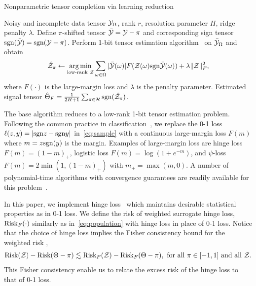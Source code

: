 \documentclass[twoside,11pt]{article}
\theoremstyle{plain}
\theoremstyle{definition}
\def\sign{\textup{sgn}}
\def\risk{\textup{Risk}}
\begin{document}
\begin{algorithm}[h!]
  \caption{Nonparametric tensor completion via learning reduction}\label{alg:tensorT}
 \begin{algorithmic}[1] 
\INPUT Noisy and incomplete data tensor $\mathcal{Y}_\Omega$, rank $r$, resolution parameter $H$, ridge penalty $\lambda$.
\State Define $\pi$-shifted tensor $\bar {\mathcal{Y}}=\mathcal{Y}-\pi$ and corresponding sign tensor $\sign(\bar \tY)=\sign(\tY-\pi)$. 
\State Perform 1-bit tensor estimation algorithm~\citep{ghadermarzy2018learning,wang2018learning,hong2020generalized,alquier2019estimation} on $\bar {\mathcal{Y}}_\Omega$ and obtain 
\begin{align}\hat \tZ_\pi\leftarrow \argmin_{\text{low-rank }\tZ}\sum_{\omega\in \Omega} |\bar \tY(\omega)|F(\tZ(\omega)\sign\bar \tY(\omega))+\lambda\FnormSize{}{\tZ}^2,
\end{align} where $F(\cdot)$ is the large-margin loss and $\lambda$ is the penalty parameter.
\EndFor
\OUTPUT Estimated signal tensor $\hat \Theta_F={1\over 2H+1}\sum_{\pi \in \tH}\sign(\hat \tZ_\pi)$.
\end{algorithmic}
\end{algorithm}

The base algorithm reduces to a low-rank 1-bit tensor estimation problem. Following the common practice in classification~\cite{bartlett2006convexity}, we replace the 0-1 loss $\ell(z,y)=|\sign z - \sign y|$ in~\eqref{eq:sample} with a continuous large-margin loss $F(m)$ where $m=z\sign(y)$ is the margin. Examples of large-margin loss are hinge loss $F(m) = (1-m)_+$, logistic loss $F(m) =\log(1+e^{-m})$, and $\psi$-loss $F(m)=2\min(1,(1-m)_+)$ with $m_{+}=\max(m,0)$. A number of polynomial-time algorithms with convergence guarantees are readily available for this problem~\citep{ghadermarzy2018learning,wang2018learning,hong2020generalized,alquier2019estimation}.

In this paper, we implement hinge loss~\citep{alquier2019estimation,genzel2020robust,he2017kernelized} which maintains desirable statistical properties as in 0-1 loss.
We define the risk of weighted surrogate hinge loss, $\risk_F(\cdot)$  similarly as in~\eqref{eq:population} with hinge loss in place of 0-1 loss.  Notice that the choice of hinge loss implies the Fisher consistency bound for the weighted risk \citep{scott2011surrogate},
\begin{equation*} \label{eq:fisher}
\risk(\tZ)-\risk(\Theta-\pi)\lesssim \risk_{F}(\tZ)-\risk_{F}(\Theta-\pi), \text{ for all $\pi\in[-1,1]$ and all $\tZ$}.
\end{equation*}
This Fisher consistency enable us to relate the excess risk of the hinge loss to that of 0-1 loss.
\end{document}
